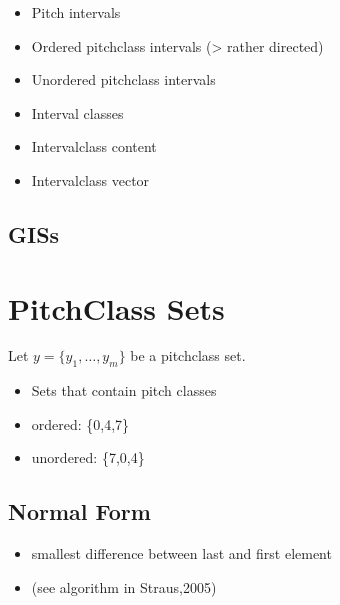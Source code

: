 \documentclass[letterpaper,10pt,english]{sphinxmanual}
\begin{document}
\begin{sphinxVerbatim}[commandchars=\\\{\}]
  
\end{sphinxVerbatim}
\begin{itemize}
\item {} 
Pitch intervals

\item {} 
Ordered pitch\sphinxhyphen{}class intervals (\sphinxhyphen{}\textgreater{} rather directed)

\item {} 
Unordered pitch\sphinxhyphen{}class intervals

\item {} 
Interval classes

\item {} 
Interval\sphinxhyphen{}class content

\item {} 
Interval\sphinxhyphen{}class vector

\end{itemize}


\subsection{GISs}
\label{\detokenize{2_fundamentals1:giss}}

\section{Pitch\sphinxhyphen{}Class Sets}
\label{\detokenize{2_fundamentals1:pitch-class-sets}}
Let \(y=\{y_1,\ldots,y_m\}\) be a pitch\sphinxhyphen{}class set.
\begin{itemize}
\item {} 
Sets that contain pitch classes

\item {} 
ordered: \{0,4,7\}

\item {} 
unordered: \{7,0,4\}

\end{itemize}


\subsection{Normal Form}
\label{\detokenize{2_fundamentals1:normal-form}}\begin{itemize}
\item {} 
smallest difference between last and first element

\item {} 
(see algorithm in Straus,2005)

\end{itemize}
\end{document}
